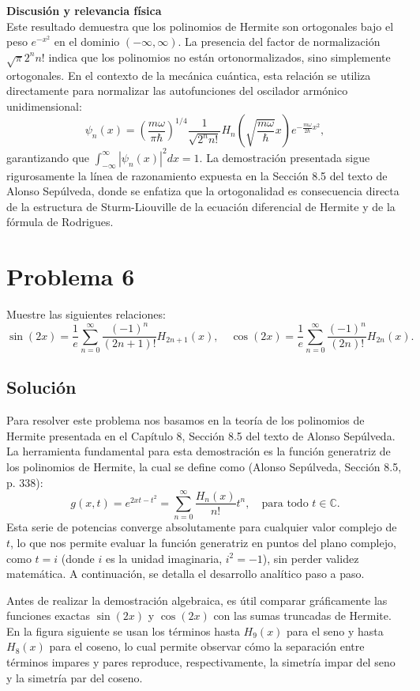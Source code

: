 \documentclass[a4paper]{article}
\begin{document}
\vspace{0.3cm}
\noindent\textbf{Discusión y relevancia física} \\
Este resultado demuestra que los polinomios de Hermite son ortogonales bajo el peso $e^{-x^2}$ en el dominio $(-\infty, \infty)$. La presencia del factor de normalización $\sqrt{\pi} 2^n n!$ indica que los polinomios no están ortonormalizados, sino simplemente ortogonales. En el contexto de la mecánica cuántica, esta relación se utiliza directamente para normalizar las autofunciones del oscilador armónico unidimensional:
$$
\psi_n(x) = \left( \frac{m\omega}{\pi \hbar} \right)^{1/4} \frac{1}{\sqrt{2^n n!}} H_n\left( \sqrt{\frac{m\omega}{\hbar}} x \right) e^{-\frac{m\omega}{2\hbar} x^2},
$$
garantizando que $\int_{-\infty}^{\infty} |\psi_n(x)|^2 dx = 1$. La demostración presentada sigue rigurosamente la línea de razonamiento expuesta en la Sección 8.5 del texto de Alonso Sepúlveda, donde se enfatiza que la ortogonalidad es consecuencia directa de la estructura de Sturm-Liouville de la ecuación diferencial de Hermite y de la fórmula de Rodrigues.


\section{Problema 6}
Muestre las siguientes relaciones:
$$
\sin(2x) = \frac{1}{e} \sum_{n=0}^{\infty} \frac{(-1)^n}{(2n+1)!} H_{2n+1}(x), \quad \cos(2x) = \frac{1}{e} \sum_{n=0}^{\infty} \frac{(-1)^n}{(2n)!} H_{2n}(x).
$$

\subsection{Solución}
Para resolver este problema nos basamos en la teoría de los polinomios de Hermite presentada en el Capítulo 8, Sección 8.5 del texto de Alonso Sepúlveda. La herramienta fundamental para esta demostración es la función generatriz de los polinomios de Hermite, la cual se define como (Alonso Sepúlveda, Sección 8.5, p. 338):
$$
g(x, t) = e^{2xt - t^2} = \sum_{n=0}^{\infty} \frac{H_n(x)}{n!} t^n, \quad \text{para todo } t \in \mathbb{C}.
$$
Esta serie de potencias converge absolutamente para cualquier valor complejo de $t$, lo que nos permite evaluar la función generatriz en puntos del plano complejo, como $t = i$ (donde $i$ es la unidad imaginaria, $i^2 = -1$), sin perder validez matemática. A continuación, se detalla el desarrollo analítico paso a paso.

Antes de realizar la demostración algebraica, es útil comparar gráficamente las funciones exactas $\sin(2x)$ y $\cos(2x)$ con las sumas truncadas de Hermite. En la figura siguiente se usan los términos hasta $H_9(x)$ para el seno y hasta $H_8(x)$ para el coseno, lo cual permite observar cómo la separación entre términos impares y pares reproduce, respectivamente, la simetría impar del seno y la simetría par del coseno.
\end{document}
